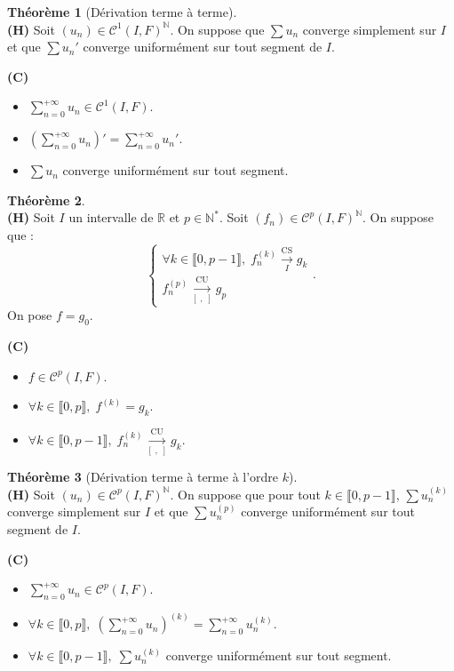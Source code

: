 \documentclass[12pt]{book}
\let\ensembleNombre\mathbb
\newcommand*\N{\ensuremath{\ensembleNombre{N}}}
\newcommand*\R{\ensuremath{\ensembleNombre{R}}}
\newcommand{\ls}[1]{\ensuremath{\overset{\mathrm{CS}}{\underset{#1}{\longrightarrow}}}}
\newcommand{\lu}[1]{\ensuremath{\overset{\mathrm{CU}}{\underset{#1}{\longrightarrow}}}}
\newcommand{\lusts}{\lu{[\; , \;]}}
\theoremstyle{definition}
\newtheorem{thme}{Théorème}[chapter]
\theoremstyle{remark}
\newenvironment{fthme}
  {\begin{mdframed}[roundcorner=10pt, linewidth=2pt]\begin{thme}}
  {\end{thme}\end{mdframed}}
\begin{document}
	\begin{fthme}[Dérivation terme à terme]\mbox{~}\\
	\textbf{(H)} Soit $(u_n) \in \mathcal C^1(I,F)^\N$. On suppose que $\sum u_n$ converge simplement sur $I$ et que $\sum u_n'$ converge uniformément sur tout segment de $I$.
	
	\noindent \textbf{(C)} \begin{itemize}
	\item[1)] $\sum_{n=0}^{+\infty} u_n \in \mathcal C^1(I,F)$.
	\item[2)] $\left( \sum_{n=0}^{+\infty} u_n \right)' = \sum_{n=0}^{+\infty} u_n'$.
	\item[3)] $\sum u_n$ converge uniformément sur tout segment.
	\end{itemize}
	\end{fthme}
	
	\begin{fthme}\mbox{~}\\
	\textbf{(H)} Soit $I$ un intervalle de $\R$ et $p \in \N^*$. Soit $(f_n) \in \mathcal C^p(I,F)^\N$. On suppose que :
	\[\begin{cases}
		\forall k\in \llbracket 0, p-1 \rrbracket,\; f_n^{(k)} \ls{I} g_k\\
		f_n^{(p)} \lusts g_p
	  \end{cases}.\]
	On pose $f = g_0$.
	
	\noindent \textbf{(C)} \begin{itemize}
	\item[1)] $f \in \mathcal C^p(I,F)$.
	\item[2)] $\forall k \in \llbracket 0, p \rrbracket,\; f^{(k)} = g_k$.
	\item[3)] $\forall k \in \llbracket 0, p-1 \rrbracket, \; f_n^{(k)} \lusts g_k$.
	\end{itemize}
	\end{fthme}
	
	\begin{fthme}[Dérivation terme à terme à l'ordre $k$]\mbox{~}\\
	\textbf{(H)} Soit $(u_n) \in \mathcal C^p(I,F)^\N$. On suppose que pour tout $k \in \llbracket 0, p-1 \rrbracket$, $\sum u_n^{(k)}$ converge simplement sur $I$ et que $\sum u_n^{(p)}$ converge uniformément sur tout segment de $I$.
	
	\noindent \textbf{(C)} \begin{itemize}
	\item[1)] $\sum_{n=0}^{+\infty} u_n \in \mathcal C^p(I,F)$.
	\item[2)] $\forall k \in \llbracket 0, p \rrbracket, \;\left( \sum_{n=0}^{+\infty} u_n \right)^{(k)} = \sum_{n=0}^{+\infty} u_n^{(k)}$.
	\item[3)] $\forall k \in \llbracket 0, p-1 \rrbracket, \; \sum u_n^{(k)}$ converge uniformément sur tout segment.
	\end{itemize}
	\end{fthme}
	
\end{document}
